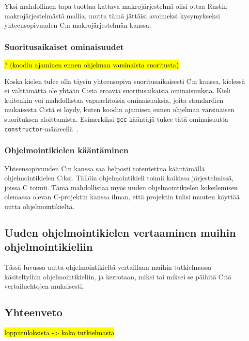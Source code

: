 Yksi mahdollinen tapa tuottaa kattava makrojärjestelmä olisi ottaa Rustin
makrojärjestelmästä mallia, mutta tämä jättäisi avoimeksi kysymykseksi
yhteensopivuuden C:n makrojärjestelmän kanssa.

\subsubsection{Suoritusaikaiset ominaisuudet}

\hl{? (koodin ajaminen ennen ohjelman varsinaista suoritusta)}

Koska kielen tulee olla täysin yhteensopiva suoritusaikaisesti C:n kanssa,
kielessä ei välttämättä ole yhtään C:stä eroavia suoritusaikaisia
ominaisuuksia. Kieli kuitenkin voi mahdollistaa vapaaehtoisia ominaisuuksia,
joita standardien mukaisesta C:stä ei löydy, kuten koodin ajamisen ennen
ohjelman varsinaisen suorituksen aloittamista. Esimerkiksi
\texttt{gcc}-kääntäjä tukee tätä ominaisuutta
\texttt{constructor}-määreellä~\citep{gccattributes}.

\subsubsection{Ohjelmointikielen kääntäminen}

Yhteensopivuuden C:n kanssa saa helposti toteutettua kääntämällä
ohjelmointikielen C:ksi. Tällöin ohjelmointikieli toimii kaikissa
järjestelmissä, joissa C toimii. Tämä mahdollistaa myös uuden ohjelmointikielen
kokeilemisen olemassa olevan C-projektin kanssa ilman, että projektin tulisi
muuten käyttää uutta ohjelmointikieltä.

\subsection[Uuden ohjelmointikielen vertaaminen muihin ohjelmointikieliin]
{Uuden ohjelmointikielen vertaaminen muihin \\ ohjelmointikieliin}

Tässä luvussa uutta ohjelmointikieltä vertaillaan muihin tutkielmassa
käsiteltyihin ohjelmointikieliin, ja kerrotaan, miksi tai miksei se päihitä
C:tä vertailuehtojen mukaisesti.

\subsection{Yhteenveto}

\hl{lopputuloksista -> koko tutkielmasta}

